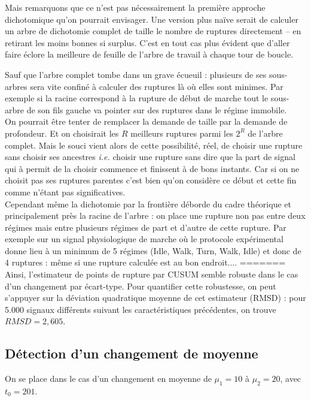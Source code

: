 \documentclass[french,12pt,notitlepage]{report}
\begin{document}
	Mais remarquons que ce n'est pas nécessairement la première approche dichotomique qu'on pourrait envisager.
	Une version plus naïve serait de calculer un arbre de dichotomie complet de taille le nombre de ruptures directement -- en retirant les moins bonnes si surplus.
	C'est en tout cas plus évident que d'aller faire éclore la meilleure de feuille de l'arbre de travail à chaque tour de boucle.
	
	Sauf que l'arbre complet tombe dans un grave écueuil : plusieurs de ses sous-arbres sera vite confiné à calculer des ruptures là où elles sont minimes.
	Par exemple si la racine correspond à la rupture de début de marche tout le sous-arbre de son fils gauche va pointer sur des ruptures dans le régime immobile.
	\\
	
	On pourrait être tenter de remplacer la demande de taille par la demande de profondeur.
	Et on choisirait les $R$ meilleurs ruptures parmi les $2^R$ de l'arbre complet.
	Mais le souci vient alors de cette possibilité, réel, de choisir une rupture sans choisir ses ancestres \emph{i.e.}
	choisir une rupture sans dire que la part de signal qui à permit de la choisir commence et finissent à de bons instants.
	Car si on ne choisit pas ses ruptures parentes c'est bien qu'on considère ce début et cette fin comme n'étant pas significatives.
	\\
	
	Cependant même la dichotomie par la frontière déborde du cadre théorique et principalement près la racine de l'arbre :
	on place une rupture non pas entre deux régimes mais entre plusieurs régimes de part et d'autre de cette rupture.
	Par exemple sur un signal physiologique de marche où le protocole expérimental donne lieu à un minimum de 5 régimes (Idle, Walk, Turn, Walk, Idle) et donc de 4 ruptures :
	même si une rupture calculée est au bon endroit....
=======
	Ainsi, l'estimateur de points de rupture par CUSUM semble robuste dans le cas d'un changement par écart-type. Pour quantifier cette robustesse, on peut s'appuyer sur la déviation quadratique moyenne de cet estimateur (RMSD) : pour 5.000 signaux différents suivant les caractéristiques précédentes, on trouve $RMSD = 2,605$.
	
	\subsection{Détection d'un changement de moyenne}
	On se place dans le cas d'un changement en moyenne de $\mu_1 = 10$ à $\mu_2 = 20$, avec $t_0 = 201$.
	
\end{document}
